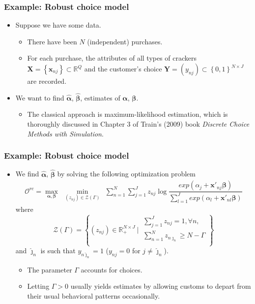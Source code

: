 \documentclass{beamer}
\begin{document}
\begin{frame}
	\frametitle{Example: Robust choice model}
	\begin{itemize}
		\item Suppose we have some data.
		\begin{itemize}
			\item There have been $N$ (independent) purchases.
			\item For each purchase, the attributes of all types of crackers $\boldsymbol{X} = \left\{\boldsymbol{x}_{nj}\right\}\subset \mathbb{R}^Q$ and the customer's choice $\boldsymbol{Y} =\left(y_{nj}\right) \subset \left\{0,1\right\}^{N\times J}$ are recorded.
		\end{itemize}
		\item We want to find $\hat{\boldsymbol{\alpha}}$, $\hat{\boldsymbol{\beta}}$, estimates of $\boldsymbol{\alpha}$, $\boldsymbol{\beta}$.
		\begin{itemize}
			\item The classical approach is maximum-likelihood estimation, which is thoroughly discussed in Chapter 3 of Train's (2009) book \textit{Discrete Choice Methods with Simulation}.
		\end{itemize}
	\end{itemize}
\end{frame}

\begin{frame}
	\frametitle{Example: Robust choice model}
	\begin{itemize}
		\item We find $\hat{\boldsymbol{\alpha}}$, $\hat{\boldsymbol{\beta}}$ by solving the following optimization problem
		\begin{align}\label{robust_choice_model_max_min}
		\mathcal{O}^{rc} = \max_{\boldsymbol{\alpha}, \boldsymbol{\beta}}\ \ \min_{\left(z_{nj}\right)\in \mathcal{Z}\left(\Gamma\right)}\ \
		\sum_{n=1}^N \sum_{j=1}^J z_{nj} \log\dfrac{exp\left(\alpha_j + \boldsymbol{x}'_{nj}\boldsymbol{\beta}\right)}{\sum_{l=1}^J exp\left(\alpha_l + \boldsymbol{x}'_{nl}\boldsymbol{\beta}\right)}
		\end{align}
		where \[\mathcal{Z}\left(\Gamma\right) = \left\{\left(z_{nj}\right)\in \mathbb{R}_+^{N\times J} \ \bigg\rvert\ \begin{matrix}
		\sum_{j=1}^J z_{nj}=1,\forall n, \\[1ex]
		\sum_{n=1}^N z_{n\hat{\jmath}_n} \geq N - \Gamma \\
		\end{matrix} \right\}\]
		and $\hat{\jmath}_n$ is such that $y_{n\hat{\jmath}_n} = 1$ ($y_{nj}=0$ for $j\neq \hat{\jmath}_n $).
		\begin{itemize}
			\item The parameter $\Gamma$ accounts for  choices.
			\item Letting $\Gamma > 0$ usually yields  estimates by allowing customs to depart from their usual behavioral patterns occasionally.
		\end{itemize}
	\end{itemize}
\end{frame}
\end{document}
